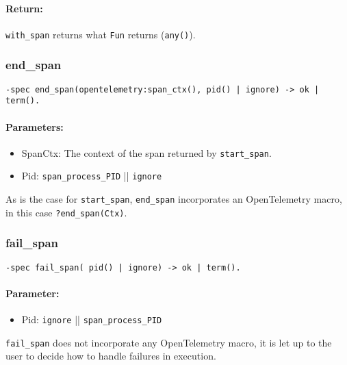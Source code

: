         \paragraph{Return:}
            \texttt{with\_span} returns what \texttt{Fun} returns (\texttt{any()}).
        
        \subsubsection{end\_span}
            \begin{verbatim}                
-spec end_span(opentelemetry:span_ctx(), pid() | ignore) -> ok | term().
            \end{verbatim}
            \paragraph{Parameters:}
            \begin{itemize}
                \item SpanCtx: The context of the span returned by \texttt{start\_span}.
                \item Pid: \texttt{span\_process\_PID} || \texttt{ignore}
            \end{itemize}

    As is the case for \texttt{start\_span}, \texttt{end\_span} incorporates an OpenTelemetry macro, in this case \texttt{?end\_span(Ctx)}. \\

        \subsubsection{fail\_span}
        \begin{verbatim}        
-spec fail_span( pid() | ignore) -> ok | term().
        \end{verbatim}
        \paragraph{Parameter:}
             \begin{itemize}
                \item Pid: \texttt{ignore} || \texttt{span\_process\_PID}
            \end{itemize}
            \texttt{fail\_span} does not incorporate any OpenTelemetry macro, it is let up to the user to decide how to handle failures in execution. \\
           
